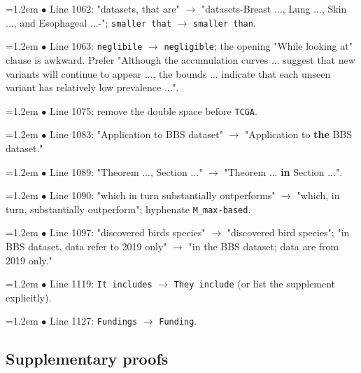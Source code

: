 \documentclass[10pt,a4paper]{article}
\begin{document}
\par\smallskip\noindent\hangindent=1.2em $\bullet$ Line 1062: "datasets, that are" $\to$ "datasets-Breast ..., Lung ..., Skin ..., and Esophageal ...-"; \texttt{smaller that} $\to$ \texttt{smaller than}.
\par\smallskip\noindent\hangindent=1.2em $\bullet$ Line 1063: \texttt{neglibile} $\to$ \texttt{negligible}; the opening "While looking at" clause is awkward. Prefer "Although the accumulation curves ... suggest that new variants will continue to appear ..., the bounds ... indicate that each unseen variant has relatively low prevalence ...".
\par\smallskip\noindent\hangindent=1.2em $\bullet$ Line 1075: remove the double space before \texttt{TCGA}.
\par\smallskip\noindent\hangindent=1.2em $\bullet$ Line 1083: "Application to BBS dataset" $\to$ "Application to \textbf{the} BBS dataset."
\par\smallskip\noindent\hangindent=1.2em $\bullet$ Line 1089: "Theorem ..., Section ..." $\to$ "Theorem ... \textbf{in} Section ...".
\par\smallskip\noindent\hangindent=1.2em $\bullet$ Line 1090: "which in turn substantially outperforms" $\to$ "which, in turn, substantially outperform"; hyphenate \texttt{M\_\allowbreak{}max-based}.
\par\smallskip\noindent\hangindent=1.2em $\bullet$ Line 1097: "discovered birds species" $\to$ "discovered bird species"; "in BBS dataset, data refer to 2019 only" $\to$ "in the BBS dataset; data are from 2019 only."
\par\smallskip\noindent\hangindent=1.2em $\bullet$ Line 1119: \texttt{It includes} $\to$ \texttt{They include} (or list the supplement explicitly).
\par\smallskip\noindent\hangindent=1.2em $\bullet$ Line 1127: \texttt{Fundings} $\to$ \texttt{Funding}.

\subsection*{Supplementary proofs}
\end{document}
